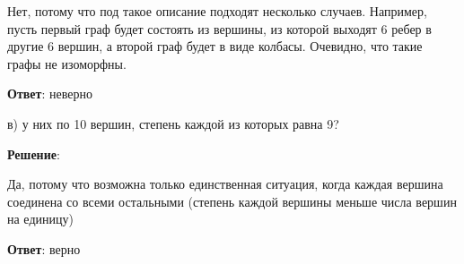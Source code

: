 \documentclass{article}
\begin{document}
\begin{enumerate}
    Нет, потому что под такое описание подходят несколько случаев. Например, пусть первый граф будет состоять из вершины, из которой выходят 6 ребер в другие 6 вершин, а второй граф будет в виде колбасы. Очевидно, что такие графы не изоморфны.

    \textbf{Ответ}:
    неверно

    в) у них по 10 вершин, степень каждой из которых равна 9?

    \textbf{Решение}:

    Да, потому что возможна только единственная ситуация, когда каждая вершина соединена со всеми остальными (степень каждой вершины меньше числа вершин на единицу)

    \textbf{Ответ}:
    верно
    
    
\end{enumerate}
\end{document}
